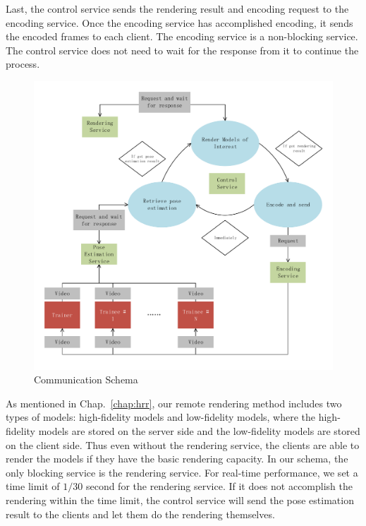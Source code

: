 Last, the control service sends the rendering result and encoding request to the encoding service. Once the encoding service has accomplished encoding, it sends the encoded frames to each client.
The encoding service is a non-blocking service. The control service does not need to wait for the response from it to continue the process.

\begin{figure}[!htbp]
	\centering
	\includegraphics[width=\textwidth]{figures/communication_schema.pdf}
	\caption{Communication Schema}
	\label{fig-comm-schem}
\end{figure}

As mentioned in Chap.~\ref{chap:hrr}, our remote rendering method includes two types of models: high-fidelity models and low-fidelity models, where the high-fidelity models are stored on the server side and the low-fidelity models are stored on the client side. Thus even without the rendering service, the clients are able to render the models if they have the basic rendering capacity.
In our schema, the only blocking service is the rendering service. For real-time performance, we set a time limit of $1/30$ second for the rendering service. If it does not accomplish the rendering within the time limit, the control service will send the pose estimation result to the clients and let them do the rendering themselves.

